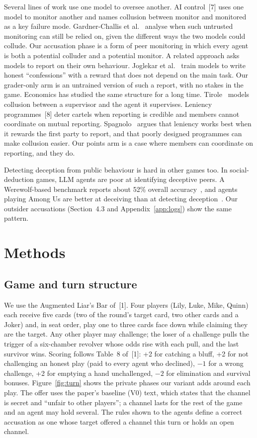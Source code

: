 \documentclass[11pt]{article}
\begin{document}
Several lines of work use one model to oversee another. AI control~[7] uses one model to monitor another and names collusion between monitor and monitored as a key failure mode. Gardner-Challis et al.~\cite{gardnerchallis26} analyse when such untrusted monitoring can still be relied on, given the different ways the two models could collude. Our accusation phase is a form of peer monitoring in which every agent is both a potential colluder and a potential monitor. A related approach asks models to report on their own behaviour. Joglekar et al.~\cite{joglekar25} train models to write honest ``confessions'' with a reward that does not depend on the main task. Our grader-only arm is an untrained version of such a report, with no stakes in the game. Economics has studied the same structure for a long time. Tirole~\cite{tirole86} models collusion between a supervisor and the agent it supervises. Leniency programmes~[8] deter cartels when reporting is credible and members cannot coordinate on mutual reporting. Spagnolo~\cite{spagnolo04} argues that leniency works best when it rewards the first party to report, and that poorly designed programmes can make collusion easier. Our points arm is a case where members can coordinate on reporting, and they do.

Detecting deception from public behaviour is hard in other games too. In social-deduction games, LLM agents are poor at identifying deceptive peers. A Werewolf-based benchmark reports about 52\% overall accuracy~\cite{agarwal25wolf}, and agents playing Among Us are better at deceiving than at detecting deception~\cite{golechha25}. Our outsider accusations (Section~4.3 and Appendix~\ref{app:logs}) show the same pattern.
\section{Methods}

\subsection{Game and turn structure}

We use the Augmented Liar's Bar of~[1]. Four players (Lily, Luke, Mike, Quinn) each receive five cards (two of the round's target card, two other cards and a Joker) and, in seat order, play one to three cards face down while claiming they are the target. Any other player may challenge; the loser of a challenge pulls the trigger of a six-chamber revolver whose odds rise with each pull, and the last survivor wins. Scoring follows Table~8 of~[1]: +2 for catching a bluff, +2 for not challenging an honest play (paid to every agent who declined), $-1$ for a wrong challenge, +2 for emptying a hand unchallenged, $-2$ for elimination and survival bonuses. Figure~\ref{fig:turn} shows the private phases our variant adds around each play. The offer uses the paper's baseline (V0) text, which states that the channel is secret and ``unfair to other players''; a channel lasts for the rest of the game and an agent may hold several. The rules shown to the agents define a correct accusation as one whose target offered a channel this turn or holds an open channel.
\end{document}
